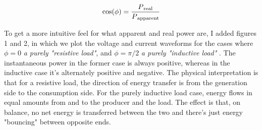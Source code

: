 \documentclass[a4paper]{article}
\def\SB#1{\textsubscript{{#1}}}
\begin{document}
\begin{align*}
  \cos(\phi) = \frac{P\SB{real}}{P\SB{apparent}}
\end{align*}

To get a more intuitive feel for what apparent and real power are, I added
figures 1 and 2, in which we plot the voltage and current waveforms for the cases
where $\phi = 0$ \emph{a purely "resistive load"}, and $\phi = \pi / 2$ \emph{a 
purely "inductive load"} .
The instantaneous power in the former case is always positive,
whereas in the inductive case it's alternately positive and negative.
The physical interpretation is that for a resistive load, the direction of
energy transfer is from the generation side to the consumption side. For
the purely inductive load case, energy flows in equal amounts from and
to the producer and the load. The effect is that, on balance, no net energy
is transferred between the two and there's just energy "bouncing" between
opposite ends.
\end{document}
